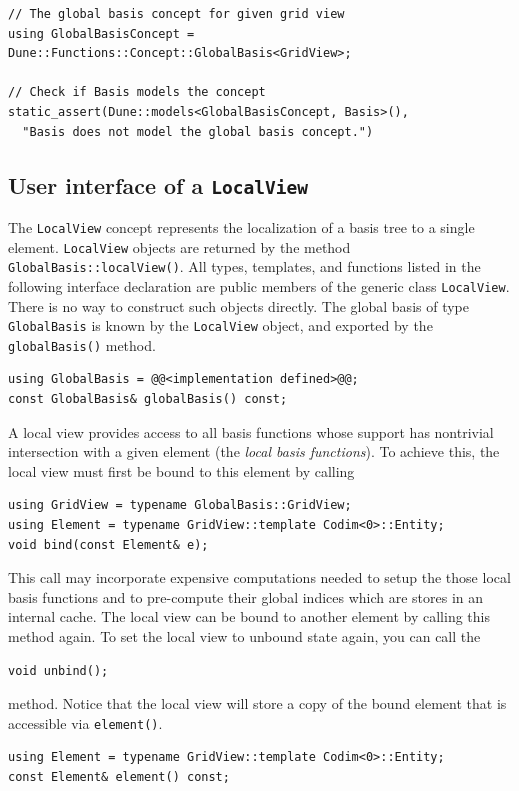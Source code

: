 \documentclass[a4paper,10pt,headings=normal,bibliography=totoc]{scrartcl}
\newcommand{\cpp}[1]{\lstinline[basicstyle=\ttfamily]!#1!}
\begin{document}
\begin{lstlisting}[style=Example]
// The global basis concept for given grid view
using GlobalBasisConcept = Dune::Functions::Concept::GlobalBasis<GridView>;

// Check if Basis models the concept
static_assert(Dune::models<GlobalBasisConcept, Basis>(),
  "Basis does not model the global basis concept.")
\end{lstlisting}

\subsection{User interface of a \texorpdfstring{\cpp{LocalView}}{LocalView}}

The \cpp{LocalView} concept represents the localization of a basis tree to a single element.
\cpp{LocalView} objects are returned by the method \cpp{GlobalBasis::localView()}.
All types, templates, and functions listed in the following
interface declaration are public members of
the generic class \cpp{LocalView}.
There is no way to construct such objects directly.
The global basis of type \cpp{GlobalBasis}
is known by the \cpp{LocalView} object, and exported by the \cpp{globalBasis()} method.
\begin{lstlisting}[style=Interface]
using GlobalBasis = @@<implementation defined>@@;
const GlobalBasis& globalBasis() const;
\end{lstlisting}

A local view provides access to all basis
functions whose support has nontrivial intersection with
a given element (the \emph{local basis functions}).
To achieve this, the local view must
first be bound to this element by calling
\begin{lstlisting}[style=Interface]
using GridView = typename GlobalBasis::GridView;
using Element = typename GridView::template Codim<0>::Entity;
void bind(const Element& e);
\end{lstlisting}
This call may incorporate expensive computations needed to
setup the those local basis functions
and to pre-compute their global indices
which are stores in an internal cache.
The local view can be
bound to another element by calling this method again.
To set the local view to unbound state again, you
can call the
\begin{lstlisting}[style=Interface]
void unbind();
\end{lstlisting}
method.
Notice that the local view will store a copy of the bound
element that is accessible via \cpp{element()}.
\begin{lstlisting}[style=Interface]
using Element = typename GridView::template Codim<0>::Entity;
const Element& element() const;
\end{lstlisting}
\end{document}
